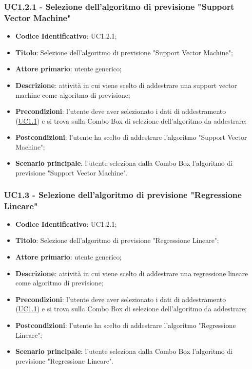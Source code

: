 		\label{par:UC1.2}
		\subsubsection{UC1.2.1 - Selezione dell'algoritmo di previsione "Support Vector Machine"}
		\begin{itemize}
			\item\textbf{Codice Identificativo}: UC1.2.1;
			\item\textbf{Titolo}: Selezione dell'algoritmo di previsione "Support Vector Machine";
			\item\textbf{Attore primario}: utente generico;
			\item\textbf{Descrizione}: attività in cui viene scelto di addestrare una support vector machine come algoritmo di previsione;
			\item\textbf{Precondizioni}: l'utente deve aver selezionato i dati di addestramento (\hyperref[par:UC1.1]{UC1.1}) e si trova sulla Combo Box di selezione dell'algoritmo da addestrare;
			\item\textbf{Postcondizioni}: l'utente ha scelto di addestrare l'algoritmo "Support Vector Machine";
			\item\textbf{Scenario principale}: l'utente seleziona dalla Combo Box l'algoritmo di previsione "Support Vector Machine".
		\end{itemize}
		
		\label{par:UC1.3}
		\subsubsection{UC1.3 - Selezione dell'algoritmo di previsione "Regressione Lineare"}
		\begin{itemize}
			\item\textbf{Codice Identificativo}: UC1.2.1;
			\item\textbf{Titolo}: Selezione dell'algoritmo di previsione "Regressione Lineare";
			\item\textbf{Attore primario}: utente generico;
			\item\textbf{Descrizione}: attività in cui viene scelto di addestrare una regressione lineare come algoritmo di previsione;
			\item\textbf{Precondizioni}: l'utente deve aver selezionato i dati di addestramento (\hyperref[par:UC1.1]{UC1.1}) e si trova sulla Combo Box di selezione dell'algoritmo da addestrare;
			\item\textbf{Postcondizioni}: l'utente ha scelto di addestrare l'algoritmo "Regressione Lineare";
			\item\textbf{Scenario principale}: l'utente seleziona dalla Combo Box l'algoritmo di previsione "Regressione Lineare".		
		\end{itemize}
		
